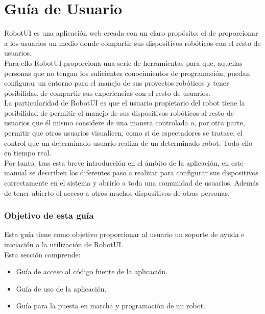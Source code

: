\newpage


\chapter{ Guía de Usuario}
\label{chap:manual-usuario}

RobotUI es una aplicación web creada con un claro propósito; el de  proporcionar a los usuarios un medio donde compartir sus dispositivos robóticos con el resto de usuarios.\\

Para ello RobotUI proporciona una serie de herramientas para que, aquellas personas que no tengan los suficientes conocimientos de programación, puedan configurar un
entorno para el manejo de sus proyectos robóticos y tener posibilidad de compartir sus experiencias con el resto de usuarios.\\

La particularidad de RobotUI es que el usuario propietario del robot tiene la posibilidad de permitir el manejo de sus dispositivos robóticos al resto de usuarios que él mismo considere de una 
manera controlada o, por otra parte, permitir que otros usuarios visualicen, como si de espectadores se tratase, el control que un determinado usuario realiza de un determinado robot.
Todo ello en tiempo real.\\

Por tanto, tras esta breve introducción en el ámbito de la aplicación, en este manual se describen los diferentes paso a realizar para configurar sus dispositivos correctamente en el sistema
y abrirlo a toda una comunidad de usuarios. Además de tener abierto el acceso a otros muchos dispositivos de otras personas.\\

\subsection{Objetivo de esta guía}

Esta guía tiene como objetivo proporcionar al usuario un soporte de ayuda e iniciación a la utilización de RobotUI.\\

Esta sección comprende:\\

\begin{itemize}
 \item Guía de acceso al código fuente de la aplicación.
 \item Guía de uso de la aplicación.
 \item Guía para la puesta en marcha y programación de un robot.
\end{itemize}

